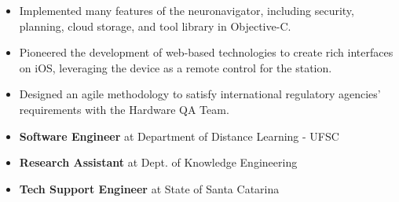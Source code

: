 \documentclass[10pt,a4paper]{altacv}
\begin{document}
\begin{itemize}
\item Implemented many features of the neuronavigator, including security,  planning, cloud storage, and tool library in Objective-C.
\item Pioneered the development of web-based technologies to create rich interfaces on iOS, leveraging the device as a remote control for the station.
\item Designed an agile methodology to satisfy international regulatory agencies' requirements with the Hardware QA Team.
\end{itemize}
\divider

\begin{itemize}

\item \textbf{Software Engineer} at Department of Distance Learning - UFSC
\item \textbf{Research Assistant} at Dept. of Knowledge Engineering
\item \textbf{Tech Support Engineer} at State of Santa Catarina
\end{itemize}

\clearpage
\end{document}
